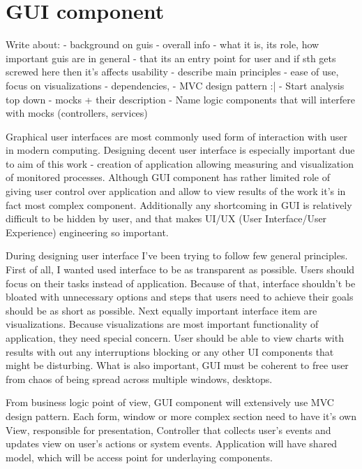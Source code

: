  
%


\section{GUI component}
\label{sec:arch_gui}

Write about:
- background on guis
- overall info - what it is, its role, how important guis are in general - that its an entry point for user and if sth
gets screwed here then it's affects usability 
- describe main principles - ease of use, focus on visualizations 
- dependencies,
- MVC design pattern :|
- Start analysis top down - mocks + their description
- Name logic components that will interfere with mocks (controllers, services)

Graphical user interfaces are most commonly used form of interaction with user in modern computing. Designing decent
user interface is especially important due to aim of this work - creation of application allowing measuring and
visualization of monitored processes. Although GUI component has rather limited role of giving user control over
application and allow to view results of the work it's in fact most complex component. Additionally any shortcoming in
GUI is relatively difficult to be hidden by user, and that makes UI/UX (User Interface/User Experience) engineering so
important.

During designing user interface I've been trying to follow few general principles. First of all, I wanted used
interface to be as transparent as possible. Users should focus on their tasks instead of application. Because of that,
interface shouldn't be bloated with unnecessary options and steps that users need to achieve their goals should be as
short as possible. Next equally important interface item are visualizations. Because visualizations are most important
functionality of application, they need special concern. User should be able to view charts with results with out
any interruptions blocking or any other UI components that might be disturbing. What is also important, GUI must be
coherent to free user from chaos of being spread across multiple windows, desktops. 

From business logic point of view, GUI component will extensively use MVC design pattern\cite{gamma1995}. Each form,
window or more complex section need to have it's own View, responsible for presentation, Controller that collects
user's events and updates view on user's actions or system events. Application will have shared model, which will be
access point for underlaying components.
 


